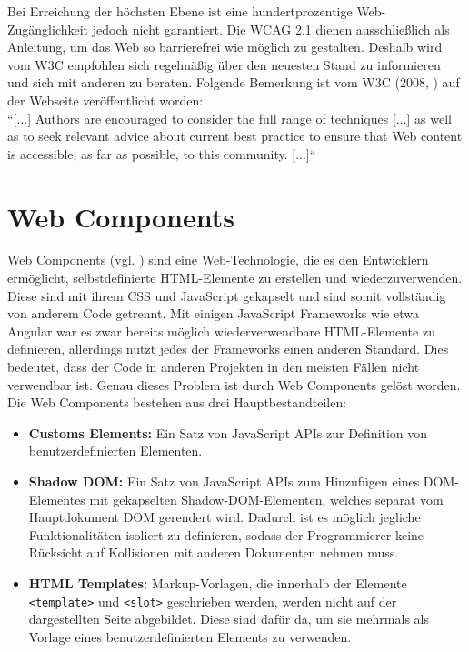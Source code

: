 Bei Erreichung der höchsten Ebene ist eine hundertprozentige Web-Zugänglichkeit jedoch nicht garantiert. Die WCAG 2.1 dienen ausschließlich als Anleitung, um das Web so barrierefrei wie möglich zu gestalten. Deshalb wird vom W3C empfohlen sich regelmäßig über den neuesten Stand zu informieren und sich mit anderen zu beraten. Folgende Bemerkung ist vom W3C (2008, \cite{wcag_2_1_2018}) auf der Webseite veröffentlicht worden:\\
``[...] Authors are encouraged to consider the full range of techniques [...] as well as to seek relevant advice about current best practice to ensure that Web content is accessible, as far as possible, to this community. [...]``

\section{Web Components}
\label{web_comp}
Web Components (vgl. \cite{moz_webcomp_2019}) sind eine Web-Technologie, die es den Entwicklern ermöglicht, selbstdefinierte HTML-Elemente zu erstellen und wiederzuverwenden. Diese sind mit ihrem CSS und JavaScript gekapselt und sind somit vollständig von anderem Code getrennt. Mit einigen JavaScript Frameworks wie etwa Angular war es zwar bereits möglich wiederverwendbare HTML-Elemente zu definieren, allerdings nutzt jedes der Frameworks einen anderen Standard. Dies bedeutet, dass der Code in anderen Projekten in den meisten Fällen nicht verwendbar ist. Genau dieses Problem ist durch Web Components gelöst worden. Die Web Components bestehen aus drei Hauptbestandteilen:

\begin{itemize}
	\item \textbf{Customs Elements:} Ein Satz von JavaScript APIs zur Definition von benutzerdefinierten Elementen.
	\item \textbf{Shadow DOM:} Ein Satz von JavaScript APIs zum Hinzufügen eines DOM-Elementes mit gekapselten Shadow-DOM-Elementen, welches separat vom Hauptdokument DOM gerendert wird. Dadurch ist es möglich jegliche Funktionalitäten isoliert zu definieren, sodass der Programmierer keine Rücksicht auf Kollisionen mit anderen Dokumenten nehmen muss.
	\item \textbf{HTML Templates:} Markup-Vorlagen, die innerhalb der Elemente \texttt{<template>} und \texttt{<slot>} geschrieben werden, werden nicht auf der dargestellten Seite abgebildet. Diese sind dafür da, um sie mehrmals als Vorlage eines benutzerdefinierten Elements zu verwenden.
\end{itemize}

